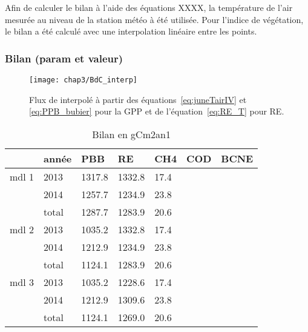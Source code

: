 Afin de calculer le bilan à l'aide des équations XXXX, la température de l'air mesurée au niveau de la station météo à été utilisée.
Pour l'indice de végétation, le bilan a été calculé avec une interpolation linéaire entre les points.

\subsubsection{Bilan (param et valeur)}

\begin{figure}
\centering
\texttt{[image: chap3/BdC\_interp]}
\caption{Flux de \coo interpolé à partir des équations~\ref{eq:juneTairIV} et \ref{eq:PPB_bubier} pour la GPP et de l'équation~\ref{eq:RE_T} pour RE.}
\label{fig:BdC_interp}
\end{figure}

%


\begin{table}
\centering
\caption{Bilan en gCm2an1}
\label{table:BdC}
\begin{tabular}{lllllll}\toprule
& année & PBB & RE & CH4 & COD & BCNE \\ \midrule
mdl 1 & 2013 & 1317.8 & 1332.8 & 17.4 & & \\[+.5ex]
& 2014 & 1257.7 & 1234.9 & 23.8 & & \\ [+1ex]
& total & 1287.7 & 1283.9 & 20.6 & &\\[+2ex]
mdl 2 & 2013 & 1035.2 & 1332.8 & 17.4 & & \\[+.5ex]
& 2014 & 1212.9 & 1234.9 & 23.8 &  & \\ [+1ex]
& total & 1124.1 & 1283.9 & 20.6 & &\\[+2ex]
mdl 3 & 2013 & 1035.2 & 1228.6 & 17.4 & & \\[+.5ex]
& 2014 & 1212.9 & 1309.6 & 23.8 & & \\ [+1ex]
& total & 1124.1 & 1269.0 & 20.6 & &\\[+1ex]
\bottomrule
\end{tabular}
\end{table}


